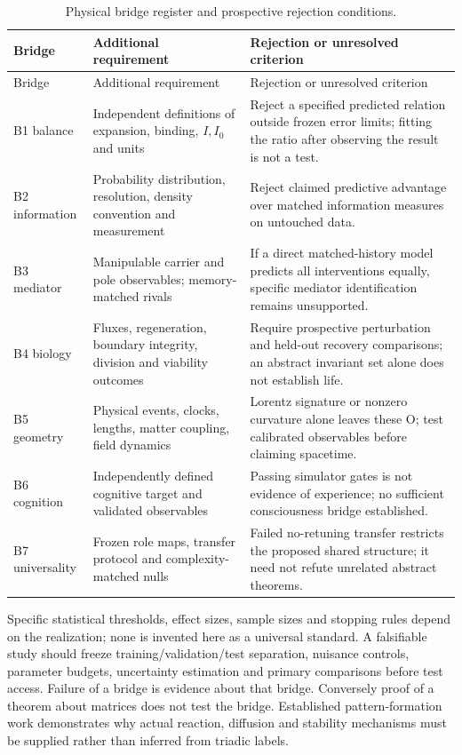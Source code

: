 \documentclass[11pt,letterpaper]{article}
\theoremstyle{definition}
\numberwithin{equation}{section}
\begin{document}
\begin{longtable}{p{}p{}p{}}
\caption{Physical bridge register and prospective rejection conditions.}\label{tab:bridges}\\
\toprule Bridge & Additional requirement & Rejection or unresolved criterion\\\midrule\endfirsthead
\toprule Bridge & Additional requirement & Rejection or unresolved criterion\\\midrule\endhead
B1 balance & Independent definitions of expansion, binding, $I,I_0$ and units & Reject a specified predicted relation outside frozen error limits; fitting the ratio after observing the result is not a test.\\
B2 information & Probability distribution, resolution, density convention and measurement & Reject claimed predictive advantage over matched information measures on untouched data.\\
B3 mediator & Manipulable carrier and pole observables; memory-matched rivals & If a direct matched-history model predicts all interventions equally, specific mediator identification remains unsupported.\\
B4 biology & Fluxes, regeneration, boundary integrity, division and viability outcomes & Require prospective perturbation and held-out recovery comparisons; an abstract invariant set alone does not establish life.\\
B5 geometry & Physical events, clocks, lengths, matter coupling, field dynamics & Lorentz signature or nonzero curvature alone leaves these O; test calibrated observables before claiming spacetime.\\
B6 cognition & Independently defined cognitive target and validated observables & Passing simulator gates is not evidence of experience; no sufficient consciousness bridge established.\\
B7 universality & Frozen role maps, transfer protocol and complexity-matched nulls & Failed no-retuning transfer restricts the proposed shared structure; it need not refute unrelated abstract theorems.\\
\bottomrule
\end{longtable}
Specific statistical thresholds, effect sizes, sample sizes and stopping rules depend on the realization; none is invented here as a universal standard. A falsifiable study should freeze training/validation/test separation, nuisance controls, parameter budgets, uncertainty estimation and primary comparisons before test access. Failure of a bridge is evidence about that bridge. Conversely proof of a theorem about matrices does not test the bridge. Established pattern-formation work \cite{turing} demonstrates why actual reaction, diffusion and stability mechanisms must be supplied rather than inferred from triadic labels.
\end{document}
